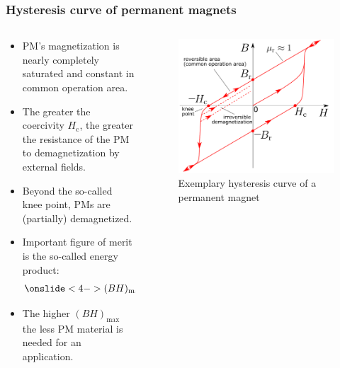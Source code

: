 \begin{frame}
	\frametitle{Hysteresis curve of permanent magnets}
	\begin{columns}
		\begin{column}{0.45\textwidth}
            \begin{itemize}
                \item PM's magnetization is nearly  completely saturated and constant in common operation area.
                \item<2-> The greater the coercivity $H_\mathrm{c}$, the greater the resistance of the PM to demagnetization by external fields.
                \item<3-> Beyond the so-called knee point, PMs are (partially) demagnetized.
                \item<4-> Important figure of merit is the so-called energy product:
                \begin{align}
                    \onslide<4->{(BH)_{\max} = \max \left\{- B H \right\}.}
                \end{align}
                \item<5-> The higher $(BH)_{\max}$ the less PM material is needed for an application.
            \end{itemize}
		\end{column}
        \hfill
		\begin{column}{0.42\textwidth}
            \vspace{-0.2cm}
			\begin{figure}
				\centering
				\includegraphics[height=0.6\textheight]{fig/lec02/Hyteresis_curve_PM.pdf}
				\caption{Exemplary hysteresis curve of a permanent magnet}
			\end{figure}
		\end{column}
		\end{columns}
\end{frame}

